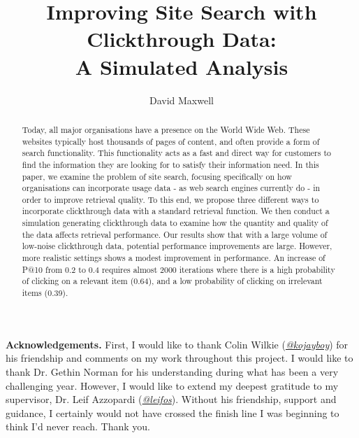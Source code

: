 \documentclass{mpaper}
\begin{document}
\newcommand{\todo}[1]{\textcolor{red}{#1}}

\title{Improving Site Search with Clickthrough Data:\\A Simulated Analysis}
\author{David Maxwell}
\maketitle

\begin{abstract}
Today, all major organisations have a presence on the World Wide Web. These websites typically host thousands of pages of content, and often provide a form of search functionality. This functionality acts as a fast and direct way for customers to find the information they are looking for to satisfy their information need. In this paper, we examine the problem of site search, focusing specifically on how organisations can incorporate usage data - as web search engines currently do - in order to improve retrieval quality. To this end, we propose three different ways to incorporate clickthrough data with a standard retrieval function. We then conduct a simulation generating clickthrough data to examine how the quantity and quality of the data affects retrieval performance. Our results show that with a large volume of low-noise clickthrough data, potential performance improvements are large. However, more realistic settings shows a modest improvement in performance. An increase of P@10 from 0.2 to 0.4 requires almost 2000 iterations where there is a high probability of clicking on a relevant item (0.64), and a low probability of clicking on irrelevant items (0.39).
\end{abstract}







{\bf Acknowledgements.} First, I would like to thank Colin Wilkie (\href{http://www.twitter.com/kojayboy}{\emph{@kojayboy}}) for his friendship and comments on my work throughout this project. I would like to thank Dr. Gethin Norman for his understanding during what has been a very challenging year. However, I would like to extend my deepest gratitude to my supervisor, Dr. Leif Azzopardi (\href{http://www.twitter.com/leifos}{\emph{@leifos}}). Without his friendship, support and guidance, I certainly would not have crossed the finish line I was beginning to think I'd never reach. Thank you.


\small{}
\balancecolumns
\end{document}
